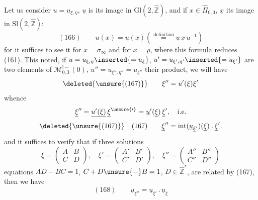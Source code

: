 Let us consider $u=u_{\xi,\eta}$,
$\underline u$ is its image in $\mathrm{Gl}(2,\widehat{\mathbb Z})$,
and if $x\in\widehat\Pi_{0,3}$, $\underline x$
its image in $\mathrm{Sl}(2,\widehat{\mathbb Z})$:
\[
(166)\qquad
\underline{u(x)}=\underline u(\underline x)
\left(\stackrel{\text{definition}}{=}
\underline u\,\underline x\,\underline u^{-1}\right)
\]
for it suffices to see it for $x=\sigma_\infty$ and for $x=\rho$,
where this formula reduces  (161). This noted,
if $u=u_{\xi,\eta}\inserted{=u_\xi}$,
$u'=u_{\xi',\eta'}\inserted{=u_{\xi'}}$
are two elements of $\mathcal M_{0,3}^{!\sim}(0)$,
$u''=u_{\xi'',\eta''}=u_{\xi''}$ their product, we will have
\[
\deleted{\unsure{(167)}}\qquad\xi''=u'(\xi)\xi'
\]
whence
\[
\underline\xi''=\underline{u'(\xi)}\,\underline\xi^{\unsure{\prime}}
=\underline u'(\underline\xi)\,\underline\xi',\quad\text{i.e.}
\]
\[
\deleted{\unsure{(167)}}\quad(167)\qquad
\underline\xi''=\operatorname{int}
(\underline u_{\underline\xi'})(\underline\xi)\mathbin{.}\underline\xi'.
\]
and it suffices to verify that if three solutions
\[
\xi=\begin{pmatrix}A&B\\C&D\end{pmatrix},
\quad\xi'=\begin{pmatrix}A'&B'\\C'&D'\end{pmatrix},
\quad\xi''=\begin{pmatrix}A''&B''\\C''&D''\end{pmatrix}
\]
 equations
$AD-BC=1$, $C+D\unsure{-}B=1$, $D\in\widehat{\mathbb Z}^{*}$,
are related by (167), then we have
\[
(168)\qquad
\underline u_{\xi''}=\underline u_{\xi'}\mathbin{.}\underline u_\xi
\]


